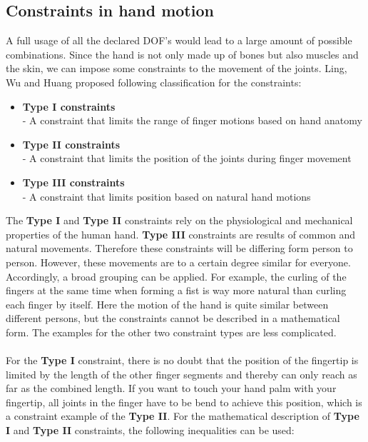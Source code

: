 \subsection{Constraints in hand motion}
A full usage of all the declared DOF's would lead to a large amount of possible combinations. Since the hand is not only made up of bones but also muscles and the skin, we can impose some constraints \cite{Badler.1987,Pavlovic.1997} to the movement of the joints. Ling, Wu and Huang  \cite{LIN.2000} proposed following classification for the constraints:
\begin{itemize}
\item \textbf{Type I constraints}\\
	- A constraint that limits the range of finger motions based on hand anatomy
	\item \textbf{Type II constraints}\\
	- A constraint that limits the position of the joints during finger movement
	\item \textbf{Type III constraints\\}
	- A constraint that limits position based on natural hand motions
\end{itemize} 
\newpage
The \textbf{Type I} and \textbf{Type II} constraints rely on the physiological and mechanical properties of the human hand. \textbf{Type III} constraints are results of common and natural movements. Therefore these constraints will be differing form person to person. However, these movements are to a certain degree similar for everyone. Accordingly, a broad grouping can be applied. For example, the curling of the fingers at the same time when forming a fist is way more natural than curling each finger by itself. Here the motion of the hand is quite similar between different persons, but the constraints cannot be described in a mathematical form. The examples for the other two constraint types are less complicated.\\\\ For the \textbf{Type I} constraint, there is no doubt that the position of the fingertip is limited by the length of the other finger segments and thereby can only reach as far as the combined length. If you want to touch your hand palm with your fingertip, all joints in the finger have to be bend to achieve this position, which is a constraint example of the \textbf{Type II}. For the mathematical description of \textbf{Type I} and \textbf{Type II} constraints, the following inequalities can be used:\\
